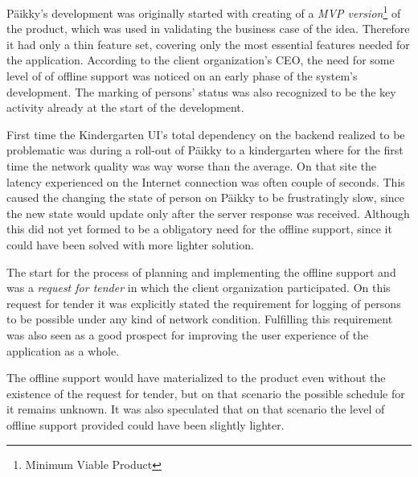 
Päikky's development was originally started with creating of a \textit{MVP version}\footnote{Minimum Viable Product} of the product, which was used in validating the business case of the idea. Therefore it had only a thin feature set, covering only the most essential features needed for the application. According to the client organization's CEO, the need for some level of of offline support was noticed on an early phase of the system's development. The marking of persons' status was also recognized to be the key activity already at the start of the development.

First time the Kindergarten UI's total dependency on the backend realized to be problematic was during a roll-out of Päikky to a kindergarten where for the first time the network quality was way worse than the average. On that site the latency experienced on the Internet connection was often couple of seconds. This caused the changing the state of person on Päikky to be frustratingly slow, since the new state would update only after the server response was received. Although this did not yet formed to be a obligatory need for the offline support, since it could have been solved with more lighter solution.

The start for the process of planning and implementing the offline support and was a \textit{request for tender} in which the client organization participated. On this request for tender it was explicitly stated the requirement for logging of persons to be possible under any kind of network condition. Fulfilling this requirement was also seen as a good prospect for improving the user experience of the application as a whole.

The offline support would have materialized to the product even without the existence of the request for tender, but on that scenario the possible schedule for it remains unknown. It was also speculated that on that scenario the level of offline support provided could have been slightly lighter.

















